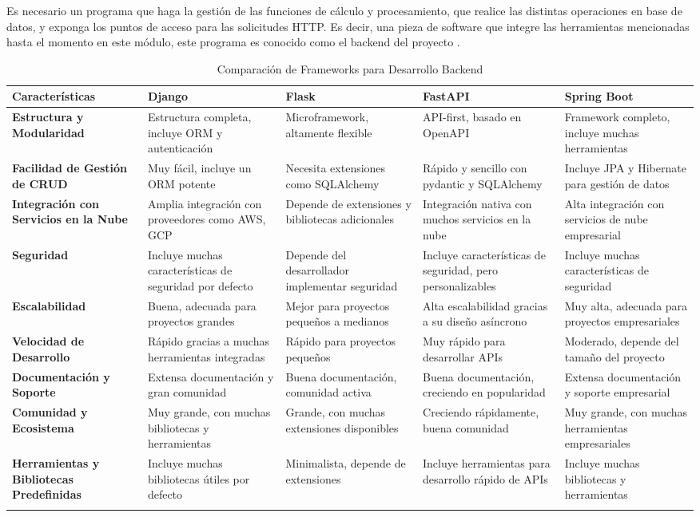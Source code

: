 Es necesario un programa que haga la gestión de las funciones de cálculo y procesamiento, que realice las distintas operaciones en base de datos, y exponga los puntos de acceso para las solicitudes HTTP. Es decir, una pieza de software que integre las herramientas mencionadas hasta el momento en este módulo, este programa es conocido como el backend del proyecto \cite{backendDev}. \\
%
\begin{longtable}{|m{3cm}|m{3cm}|m{3cm}|m{3cm}|m{3cm}|}
\hline
\textbf{Características} & \textbf{Django \cite{django}} & \textbf{Flask \cite{flask}} & \textbf{FastAPI \cite{fastapi}} & \textbf{Spring Boot \cite{springboot}} \\
\hline
\textbf{Estructura y Modularidad} & Estructura completa, incluye ORM y autenticación & Microframework, altamente flexible & API-first, basado en OpenAPI & Framework completo, incluye muchas herramientas \\
\hline
\textbf{Facilidad de Gestión de CRUD} & Muy fácil, incluye un ORM potente & Necesita extensiones como SQLAlchemy & Rápido y sencillo con pydantic y SQLAlchemy & Incluye JPA y Hibernate para gestión de datos \\
\hline
\textbf{Integración con Servicios en la Nube} & Amplia integración con proveedores como AWS, GCP & Depende de extensiones y bibliotecas adicionales & Integración nativa con muchos servicios en la nube & Alta integración con servicios de nube empresarial \\
\hline
\textbf{Seguridad} & Incluye muchas características de seguridad por defecto & Depende del desarrollador implementar seguridad & Incluye características de seguridad, pero personalizables & Incluye muchas características de seguridad \\
\hline
\textbf{Escalabilidad} & Buena, adecuada para proyectos grandes & Mejor para proyectos pequeños a medianos & Alta escalabilidad gracias a su diseño asíncrono & Muy alta, adecuada para proyectos empresariales \\
\hline
\textbf{Velocidad de Desarrollo} & Rápido gracias a muchas herramientas integradas & Rápido para proyectos pequeños & Muy rápido para desarrollar APIs & Moderado, depende del tamaño del proyecto \\
\hline
\textbf{Documentación y Soporte} & Extensa documentación y gran comunidad & Buena documentación, comunidad activa & Buena documentación, creciendo en popularidad & Extensa documentación y soporte empresarial \\
\hline
\textbf{Comunidad y Ecosistema} & Muy grande, con muchas bibliotecas y herramientas & Grande, con muchas extensiones disponibles & Creciendo rápidamente, buena comunidad & Muy grande, con muchas herramientas empresariales \\
\hline
\textbf{Herramientas y Bibliotecas Predefinidas} & Incluye muchas bibliotecas útiles por defecto & Minimalista, depende de extensiones & Incluye herramientas para desarrollo rápido de APIs & Incluye muchas bibliotecas y herramientas \\
\hline
\caption{Comparación de Frameworks para Desarrollo Backend}
\label{tab:comparacion_backend}
\end{longtable}
